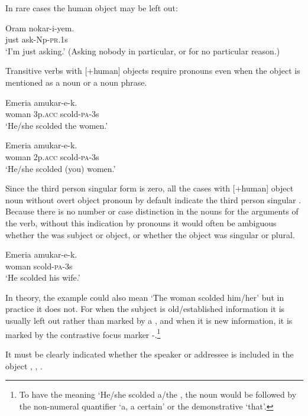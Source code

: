 In rare cases the human object may be left out:

\ea%
\label{ex:3:x553}
\gll Oram nokar-i-yem. \\
just ask-Np-\textsc{pr}.1s\\
\glt`I'm just asking.' (Asking nobody in particular, or for no particular reason.)
\z

Transitive verbs with [+human] objects require pronouns even when the object is mentioned as a noun or a noun phrase.

\ea%
\label{ex:3:x554}
\gll Emeria  amukar-e-k. \\
woman 3p.\textsc{acc} scold-\textsc{pa}-3s\\
\glt`He/she scolded the women.'
\z

\ea%
\label{ex:3:x555}
\gll Emeria  amukar-e-k. \\
woman 2p.\textsc{acc} scold-\textsc{pa}-3s\\
\glt`He/she scolded (you) women.'
\z

Since the third person singular form is zero, all the cases with [+human] object noun without overt object pronoun by default indicate the third person singular . Because there is no number or case distinction in the nouns for the arguments of the verb, without this indication by pronouns it would often be ambiguous whether the  was subject or object, or whether the object was singular or plural. 

\ea%
\label{ex:3:x556}
\gll Emeria amukar-e-k. \\
woman scold-\textsc{pa}-3s\\
\glt`He scolded his wife.'
\z

In theory, the example  could also mean `The woman scolded him/her' but in practice it does not. For when the subject is old/established information it is usually left out rather than marked by a , and when it is new information, it is marked by the contrastive focus marker -.\footnote{To have the meaning `He/she scolded a/the , the noun would be followed by the non-numeral quantifier  `a, a certain' or the demonstrative  `that'.}

It must be clearly indicated whether the speaker or addressee is included in the object , , .

